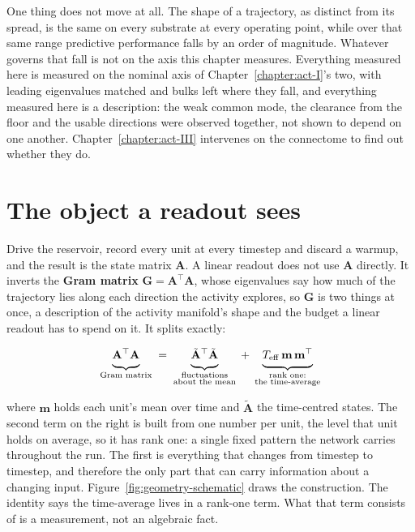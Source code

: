 One thing does not move at all. The shape of a trajectory, as distinct from its
spread, is the same on every substrate at every operating point, while over that
same range predictive performance falls by an order of magnitude. Whatever
governs that fall is not on the axis this chapter measures. Everything measured
here is measured on the nominal axis of Chapter~\ref{chapter:act-I}'s two, with
leading eigenvalues matched and bulks left where they fall, and everything
measured here is a description: the weak common mode, the clearance from the
floor and the usable directions were observed together, not shown to depend on
one another. Chapter~\ref{chapter:act-III} intervenes on the connectome to find
out whether they do.






\section{The object a readout sees}
\label{sec:act2-handover}
\bigskip


Drive the reservoir, record every unit at every timestep and discard a warmup,
and the result is the state matrix $\mathbf{A}$.
A linear readout does not use $\mathbf{A}$ directly. It inverts the \textbf{Gram matrix}
$\mathbf{G} = \mathbf{A}^{\top}\mathbf{A}$, whose eigenvalues say how much of the trajectory lies along each
direction the activity explores, so $\mathbf{G}$ is two things at once, a description of
the activity manifold's shape and the budget a linear readout has to spend on it. It
splits exactly:

\bigskip
\begin{equation}
    \underbrace{\mathbf{A}^{\top}\mathbf{A} \bracegap}_{\text{Gram matrix}}
    \;=\;
    \underbrace{\tilde{\mathbf{A}}^{\top}\tilde{\mathbf{A}} \bracegap}_{\substack{\text{fluctuations} \\ \text{about the mean}}}
    \;+\;
    \underbrace{T_{\mathrm{eff}}\,\mathbf{m}\,\mathbf{m}^{\top} \bracegap}_{\substack{\text{rank one:} \\ \text{the time-average}}}
    \label{eq:gram-split}
\end{equation}

where $\mathbf{m}$ holds each unit's mean over time and $\tilde{\mathbf{A}}$ the time-centred
states. The second term on the right is built from one number per unit, the level that unit
holds on average, so it has rank one: a single fixed pattern the network carries
throughout the run. The first is everything that changes from timestep to
timestep, and therefore the only part that can carry information about a changing
input. Figure~\ref{fig:geometry-schematic} draws the construction. The identity says the time-average lives in a
rank-one term. What that term consists of is a measurement, not an algebraic
fact.

